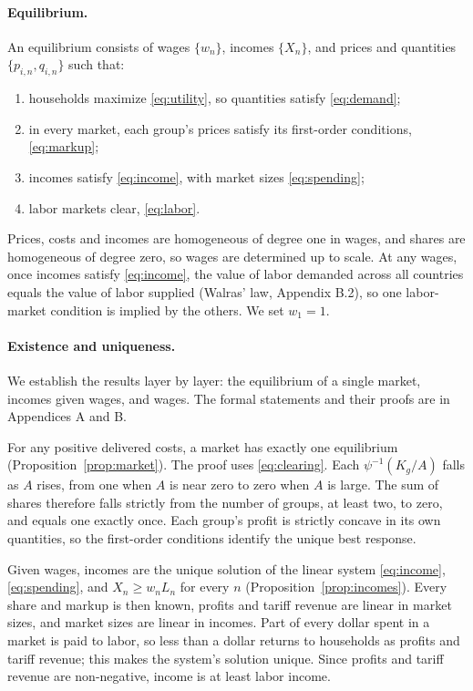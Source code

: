 \documentclass[11pt]{article}
\begin{document}
\paragraph{Equilibrium.} An equilibrium consists of wages $\{w_n\}$, incomes $\{X_n\}$,
and prices and quantities $\{p_{i,n},q_{i,n}\}$ such that:
\begin{enumerate}
\item households maximize \eqref{eq:utility}, so quantities satisfy \eqref{eq:demand};
\item in every market, each group's prices satisfy its first-order conditions,
\eqref{eq:markup};
\item incomes satisfy \eqref{eq:income}, with market sizes \eqref{eq:spending};
\item labor markets clear, \eqref{eq:labor}.
\end{enumerate}

\noindent Prices, costs and incomes are homogeneous of degree one in wages, and shares
are homogeneous of degree zero, so wages are determined up to scale. At any wages, once
incomes satisfy \eqref{eq:income}, the value of labor demanded across all countries
equals the value of labor supplied (Walras' law, Appendix B.2), so one labor-market
condition is implied by the others. We set $w_1=1$.

\paragraph{Existence and uniqueness.} We establish the results layer by layer: the
equilibrium of a single market, incomes given wages, and wages. The formal statements
and their proofs are in Appendices A and B.

For any positive delivered costs, a market has exactly one equilibrium
(Proposition~\ref{prop:market}). The proof uses \eqref{eq:clearing}. Each
$\psi^{-1}(K_g/A)$ falls as $A$ rises, from one when $A$ is near zero to zero when $A$
is large. The sum of shares therefore falls strictly from the number of groups, at
least two, to zero, and equals one exactly once. Each group's profit is strictly
concave in its own quantities, so the first-order conditions identify the unique best
response.

Given wages, incomes are the unique solution of the linear system \eqref{eq:income},
\eqref{eq:spending}, and $X_n\ge w_nL_n$ for every $n$
(Proposition~\ref{prop:incomes}). Every share and markup is then known, profits and
tariff revenue are linear in market sizes, and market sizes are linear in incomes. Part
of every dollar spent in a market is paid to labor, so less than a dollar returns to
households as profits and tariff revenue; this makes the system's solution unique.
Since profits and tariff revenue are non-negative, income is at least labor income.
\end{document}
